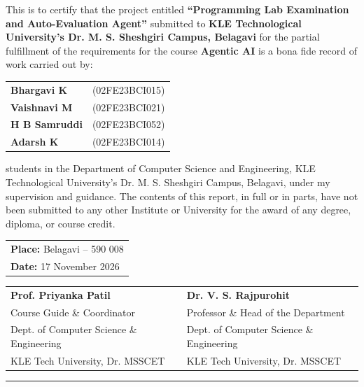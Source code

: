 \documentclass[12pt, a4paper]{report}
\begin{document}
\vspace{0.6cm}
\noindent This is to certify that the project entitled \textbf{``Programming Lab Examination and Auto-Evaluation Agent''} submitted to \textbf{KLE Technological University's Dr. M. S. Sheshgiri Campus, Belagavi} for the partial fulfillment of the requirements for the course \textbf{Agentic AI} is a bona fide record of work carried out by:
\begin{center}
\begin{tabular}{ll}
\textbf{Bhargavi K} & (02FE23BCI015) \\
\textbf{Vaishnavi M} & (02FE23BCI021) \\
\textbf{H B Samruddi} & (02FE23BCI052) \\
\textbf{Adarsh K} & (02FE23BCI014) \\
\end{tabular}
\end{center}
\noindent students in the Department of Computer Science and Engineering, KLE Technological University's Dr. M. S. Sheshgiri Campus, Belagavi, under my supervision and guidance. The contents of this report, in full or in parts, have not been submitted to any other Institute or University for the award of any degree, diploma, or course credit.

\vspace{2.0cm}
\noindent
\begin{tabular}{@{}l}
\textbf{Place:} Belagavi -- 590 008 \\
\textbf{Date:} 17 November 2026 \\
\end{tabular}

\vspace{2.2cm}
\noindent
\begin{tabular}{p{7.5cm}p{7.5cm}}
\textbf{Prof. Priyanka Patil} & \textbf{Dr. V. S. Rajpurohit} \\
Course Guide \& Coordinator & Professor \& Head of the Department \\
Dept. of Computer Science \& Engineering & Dept. of Computer Science \& Engineering \\
KLE Tech University, Dr. MSSCET & KLE Tech University, Dr. MSSCET \\
\end{tabular}

\vfill
\noindent\rule{\textwidth}{0.4pt}
\end{document}
